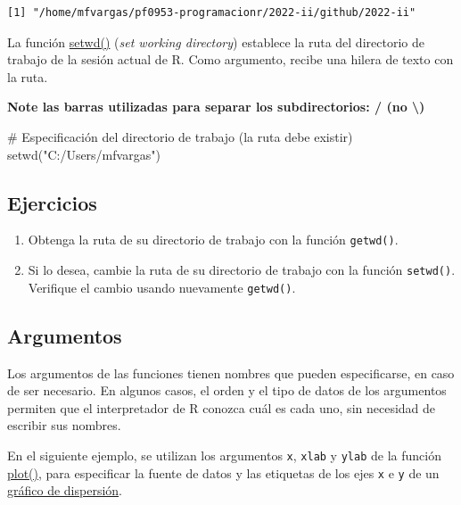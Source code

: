 \documentclass[
  letterpaper,
  DIV=11,
  numbers=noendperiod]{scrreprt}
\newenvironment{Shaded}{\begin{snugshade}}{\end{snugshade}}
\newcommand{\CommentTok}[1]{\textcolor[rgb]{0.37,0.37,0.37}{#1}}
\newcommand{\FunctionTok}[1]{\textcolor[rgb]{0.28,0.35,0.67}{#1}}
\newcommand{\NormalTok}[1]{\textcolor[rgb]{0.00,0.23,0.31}{#1}}
\newcommand{\StringTok}[1]{\textcolor[rgb]{0.13,0.47,0.30}{#1}}
\providecommand{\tightlist}{%
  \setlength{\itemsep}{0pt}\setlength{\parskip}{0pt}}\usepackage{longtable,booktabs,array}
\begin{document}
\begin{verbatim}
[1] "/home/mfvargas/pf0953-programacionr/2022-ii/github/2022-ii"
\end{verbatim}

La función \href{https://rdrr.io/r/base/getwd.html}{setwd()} (\emph{set
working directory}) establece la ruta del directorio de trabajo de la
sesión actual de R. Como argumento, recibe una hilera de texto con la
ruta.

\textbf{Note las barras utilizadas para separar los subdirectorios: /
(no \textbackslash)}

\begin{Shaded}
\begin{Highlighting}[]
\CommentTok{\# Especificación del directorio de trabajo (la ruta debe existir)}
\FunctionTok{setwd}\NormalTok{(}\StringTok{"C:/Users/mfvargas"}\NormalTok{)}
\end{Highlighting}
\end{Shaded}

\hypertarget{ejercicios-1}{%
\subsection{Ejercicios}\label{ejercicios-1}}

\begin{enumerate}
\def\labelenumi{\arabic{enumi}.}
\tightlist
\item
  Obtenga la ruta de su directorio de trabajo con la función
  \texttt{getwd()}.\\
\item
  Si lo desea, cambie la ruta de su directorio de trabajo con la función
  \texttt{setwd()}. Verifique el cambio usando nuevamente
  \texttt{getwd()}.
\end{enumerate}

\hypertarget{argumentos}{%
\subsection{Argumentos}\label{argumentos}}

Los argumentos de las funciones tienen nombres que pueden especificarse,
en caso de ser necesario. En algunos casos, el orden y el tipo de datos
de los argumentos permiten que el interpretador de R conozca cuál es
cada uno, sin necesidad de escribir sus nombres.

En el siguiente ejemplo, se utilizan los argumentos \texttt{x},
\texttt{xlab} y \texttt{ylab} de la función
\href{https://rdrr.io/r/graphics/plot.default.html}{plot()}, para
especificar la fuente de datos y las etiquetas de los ejes \texttt{x} e
\texttt{y} de un
\href{https://es.wikipedia.org/wiki/Diagrama_de_dispersi\%C3\%B3n}{gráfico
de dispersión}.
\end{document}
